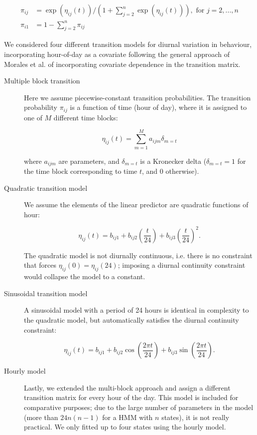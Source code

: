 \documentclass{bmcart}
\begin{document}
\begin{equation}
\begin{split}
\pi_{ij} & = \exp(\eta_{ij}(t))/\left(1+\sum_{j=2}^{n}\exp(\eta_{ij}(t))\right), \textrm{ for } j={2,...,n} \\
\pi_{i1} & = 1 - \sum_{j=2}^{n}\pi_{ij}
\end{split}
\end{equation}

We considered four different transition models for diurnal variation in behaviour, incorporating hour-of-day as a covariate following the general approach of Morales et al. \cite{morales_extracting_2004} of incorporating covariate dependence in the transition matrix.

\begin{description}

\item[Multiple block transition] Here we assume piecewise-constant transition probabilities. The transition probability $\pi_{ij}$ is a function of time (hour of day), where it is assigned to one of $M$ different time blocks:

$$
\eta_{ij}(t) = \sum_{m=1}^{M}a_{ijm} \delta_{m=t}
$$

where $a_{ijm}$ are parameters, and $\delta_{m=t}$ is a Kronecker delta ($\delta_{m=t}=1$ for the time block corresponding to time $t$, and 0 otherwise). 

\item[Quadratic transition model] 
We assume the elements of the linear predictor
are quadratic functions of hour: 

$$
\eta_{ij}(t) = b_{ij1}+b_{ij2}\left(\frac{t}{24}\right)+b_{ij3}\left(\frac{t}{24}\right)^{2} .
$$

The quadratic model is not diurnally continuous, i.e. there 
is no constraint that forces $\eta_{ij}(0)=\eta_{ij}(24)$; imposing a diurnal continuity 
constraint would collapse the model to a constant.

\item[Sinusoidal transition model] A sinusoidal model with a period of 24 hours is identical in complexity to the quadratic model, but automatically satisfies the diurnal continuity constraint:

$$
\eta_{ij}(t)= b_{ij1}+b_{ij2}\cos\left(\frac{2\pi t}{24}\right)+b_{ij3}\sin\left(\frac{2\pi t}{24}\right) .
$$

\item[Hourly model] Lastly, we extended the multi-block approach and assign  a different transition matrix for every hour of the day. This model is included for comparative purposes; due to the large number of parameters in the model (more than $24n(n-1)$ for a HMM with $n$ states), it is not really practical. We only fitted up to four states using the hourly model.  
\end{description}
\end{document}
